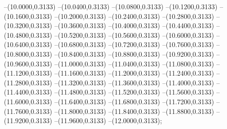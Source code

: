 {	--(10.0000,0.3133)
	--(10.0400,0.3133)
	--(10.0800,0.3133)
	--(10.1200,0.3133)
	--(10.1600,0.3133)
	--(10.2000,0.3133)
	--(10.2400,0.3133)
	--(10.2800,0.3133)
	--(10.3200,0.3133)
	--(10.3600,0.3133)
	--(10.4000,0.3133)
	--(10.4400,0.3133)
	--(10.4800,0.3133)
	--(10.5200,0.3133)
	--(10.5600,0.3133)
	--(10.6000,0.3133)
	--(10.6400,0.3133)
	--(10.6800,0.3133)
	--(10.7200,0.3133)
	--(10.7600,0.3133)
	--(10.8000,0.3133)
	--(10.8400,0.3133)
	--(10.8800,0.3133)
	--(10.9200,0.3133)
	--(10.9600,0.3133)
	--(11.0000,0.3133)
	--(11.0400,0.3133)
	--(11.0800,0.3133)
	--(11.1200,0.3133)
	--(11.1600,0.3133)
	--(11.2000,0.3133)
	--(11.2400,0.3133)
	--(11.2800,0.3133)
	--(11.3200,0.3133)
	--(11.3600,0.3133)
	--(11.4000,0.3133)
	--(11.4400,0.3133)
	--(11.4800,0.3133)
	--(11.5200,0.3133)
	--(11.5600,0.3133)
	--(11.6000,0.3133)
	--(11.6400,0.3133)
	--(11.6800,0.3133)
	--(11.7200,0.3133)
	--(11.7600,0.3133)
	--(11.8000,0.3133)
	--(11.8400,0.3133)
	--(11.8800,0.3133)
	--(11.9200,0.3133)
	--(11.9600,0.3133)
	--(12.0000,0.3133);
}
